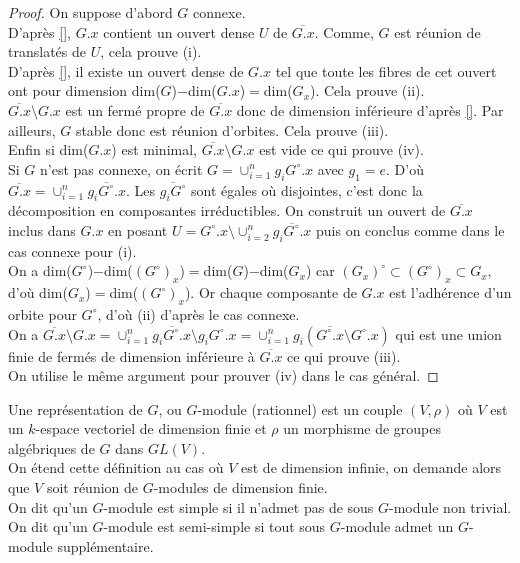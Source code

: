 \begin{proof}
On suppose d'abord $G$ connexe. \\
D'après \ref{}, $G.x$ contient un ouvert dense $U$ de $\overline{G.x}$. Comme, $G$ est réunion de translatés de $U$, cela prouve (i).\\ 
D'après \ref{}, il existe un ouvert dense de $G.x$ tel que toute les fibres de cet ouvert ont pour dimension dim($G$)$-$dim($G.x$)$=$dim($G_x$). Cela prouve (ii).\\
$\overline{G.x}\setminus G.x$ est un fermé propre de $\overline{G.x}$ donc de dimension inférieure d'après \ref{}. Par ailleurs, $G$ stable donc est réunion d'orbites. Cela prouve (iii).\\
Enfin si dim($G.x$) est minimal, $\overline{G.x}\setminus G.x$ est vide ce qui prouve (iv).\\
Si $G$ n'est pas connexe, on écrit $G=\cup_{i=1}^{n}g_iG^\circ .x$ avec $g_1=e$. D'où $\overline{G.x}=\cup_{i=1}^{n}\overline{g_iG^\circ .x}$. Les $\overline{g_iG^\circ}$ sont égales où disjointes, c'est donc la décomposition en composantes irréductibles. On construit un ouvert de $\overline{G.x}$ inclus dans $G.x$ en posant $U=G^\circ .x\setminus \cup_{i=2}^{n}\overline{g_iG^\circ .x}$ puis on conclus comme dans le cas connexe pour (i).\\
On a dim($G^\circ$)$-$dim($(G^\circ) _x$)$=$dim($G$)$-$dim($G_x$) car $(G_x)^\circ \subset(G^\circ) _x \subset G_x$, d'où dim($G_x$)$=$dim($(G^\circ) _x$). Or chaque composante de $G.x$ est l'adhérence d'un orbite pour $G^\circ$, d'où (ii) d'après le cas connexe.\\
On a $\overline{G.x}\setminus G.x=\cup_{i=1}^{n}\overline{g_iG^\circ .x}\setminus g_iG^\circ .x=\cup_{i=1}^{n}g_i(\overline{G^\circ .x}\setminus G^\circ .x)$ qui est une union finie de fermés de dimension inférieure à $\overline{G .x}$ ce qui prouve (iii).\\
On utilise le même argument pour prouver (iv) dans le cas général.
\end{proof}

\begin{defn}
Une représentation de $G$, ou $G$-module (rationnel) est un couple $(V, \rho)$ où $V$ est un $k$-espace vectoriel de dimension finie et $\rho$ un morphisme de groupes algébriques de $G$ dans $GL(V)$.\\
On étend cette définition au cas où $V$ est de dimension infinie, on demande alors que $V$ soit réunion de $G$-modules de dimension finie.\\
On dit qu'un $G$-module est simple si il n'admet pas de sous $G$-module non trivial. On dit qu'un $G$-module est semi-simple si tout sous $G$-module admet un $G$-module supplémentaire.
\end{defn}

